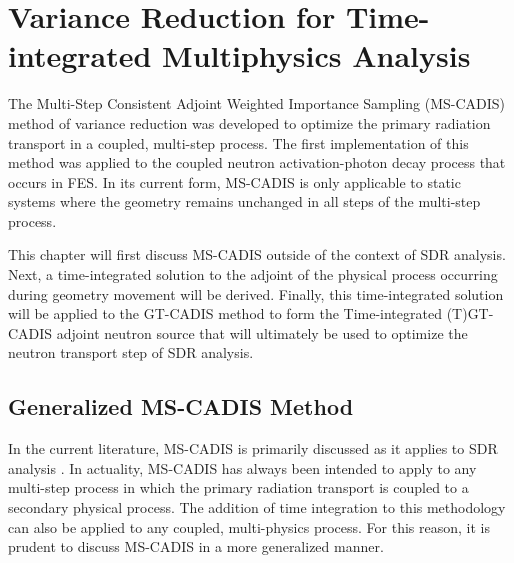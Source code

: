 \chapter{Variance Reduction for Time-integrated Multiphysics Analysis}\label{ch:tgt}

The Multi-Step Consistent Adjoint Weighted Importance Sampling (MS-CADIS)
method of variance reduction 
was developed to optimize the primary radiation transport
in a coupled, multi-step process. The first implementation of this method 
was applied to the coupled neutron activation-photon decay process that occurs
in FES.  
In its current form, MS-CADIS is only applicable to static systems where
the geometry remains unchanged in all steps of the multi-step process.

This chapter will first discuss MS-CADIS outside of the context of SDR analysis. 
Next, a time-integrated solution to the adjoint of the 
physical process occurring during geometry movement will be derived.  
Finally, this time-integrated solution will be applied to the GT-CADIS method to
form the Time-integrated (T)GT-CADIS adjoint neutron source that will
ultimately be used to optimize the neutron transport step of SDR analysis.

\section{Generalized MS-CADIS Method}
In the current literature, MS-CADIS is primarily discussed as it applies to SDR
analysis \cite{mscadis}.  In actuality, MS-CADIS has always been intended to
apply to any multi-step process in
which the primary radiation transport is coupled to a secondary physical process.
The addition of time integration to this methodology can also be applied to
any coupled, multi-physics process. For this reason, it is prudent to discuss
MS-CADIS in a more generalized manner.

